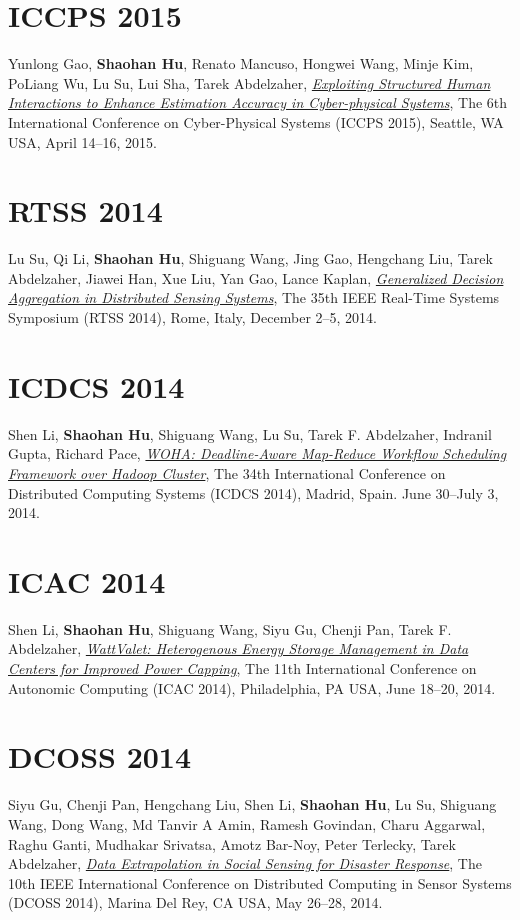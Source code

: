 \section{\sc ICCPS 2015}\hypertarget{gao2015iccps}{} Yunlong Gao, \textbf{Shaohan Hu}, Renato Mancuso, Hongwei Wang, Minje Kim, PoLiang Wu, Lu Su, Lui Sha, Tarek Abdelzaher, \href{}{\emph{Exploiting Structured Human Interactions to Enhance Estimation Accuracy in Cyber-physical Systems}}, \textsf{The 6th International Conference on Cyber-Physical Systems (ICCPS 2015)}, Seattle, WA USA, April 14--16, 2015.

\section{\sc RTSS 2014}\hypertarget{su2014rtss}{} Lu Su, Qi Li, \textbf{Shaohan Hu}, Shiguang Wang, Jing Gao, Hengchang Liu, Tarek Abdelzaher, Jiawei Han, Xue Liu, Yan Gao, Lance Kaplan, \href{http://ieeexplore.ieee.org/xpl/articleDetails.jsp?arnumber=7010369}{\emph{Generalized Decision Aggregation in Distributed Sensing Systems}}, \textsf{The 35th IEEE Real-Time Systems Symposium (RTSS 2014)}, Rome, Italy, December 2--5, 2014.

\section{\sc ICDCS 2014}\hypertarget{li2014icdcs}{} Shen Li, \textbf{Shaohan Hu}, Shiguang Wang, Lu Su, Tarek F. Abdelzaher, Indranil Gupta, Richard Pace, \href{http://dl.acm.org/citation.cfm?id=2672596.2672734}{\emph{WOHA: Deadline-Aware Map-Reduce Workflow Scheduling Framework over Hadoop Cluster}}, \textsf{The 34th International Conference on Distributed Computing Systems (ICDCS 2014)}, Madrid, Spain. June 30--July 3, 2014.

\section{\sc ICAC 2014}\hypertarget{li2014icac}{} Shen Li, \textbf{Shaohan Hu}, Shiguang Wang, Siyu Gu, Chenji Pan, Tarek F. Abdelzaher, \href{https://www.usenix.org/system/files/conference/icac14/icac14-paper-li_shen.pdf}{\emph{WattValet: Heterogenous Energy Storage Management in Data Centers for Improved Power Capping}}, \textsf{The 11th International Conference on Autonomic Computing (ICAC 2014)}, Philadelphia, PA USA, June 18--20, 2014.

\section{\sc DCOSS 2014}\hypertarget{gu2014dcoss}{} Siyu Gu, Chenji Pan, Hengchang Liu, Shen Li, \textbf{Shaohan Hu}, Lu Su, Shiguang Wang, Dong Wang, Md Tanvir A Amin, Ramesh Govindan, Charu Aggarwal, Raghu Ganti, Mudhakar Srivatsa, Amotz Bar-Noy, Peter Terlecky, Tarek Abdelzaher, \href{http://ieeexplore.ieee.org/xpl/articleDetails.jsp?arnumber=6846153}{\emph{Data Extrapolation in Social Sensing for Disaster Response}}, \textsf{The 10th IEEE International Conference on Distributed Computing in Sensor Systems (DCOSS 2014)}, Marina Del Rey, CA USA, May 26--28, 2014.

